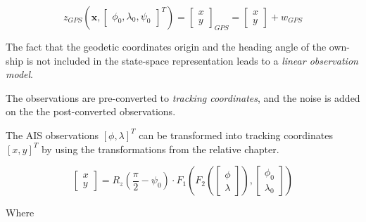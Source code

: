 \begin{equation}
z_{GPS}(\mathbf{x},\begin{bmatrix}\phi_{0}, \lambda_{0}, \psi_{\textit{0}} \end{bmatrix}^{T}) = \begin{bmatrix}
x \\
y
\end{bmatrix}_{GPS} = \begin{bmatrix}
x \\
y
\end{bmatrix} + w_{GPS}
\end{equation}

The fact that the geodetic coordinates origin and the heading angle of the own-ship is not included in the state-space representation leads to a \emph{linear observation model}.

The observations are pre-converted to \emph{tracking coordinates}, and the noise is added on the the post-converted observations.

The AIS observations $[\phi, \lambda]^{T}$ can be transformed into tracking coordinates $[x,y]^{T}$ by using the transformations from the relative chapter.


\begin{equation}
\begin{bmatrix}
x \\
y
\end{bmatrix} = R_z(\frac{\pi}{2}-\psi_{\textit{0}}) \cdot F_1\left(F_2(\begin{bmatrix}
\phi \\
\lambda
\end{bmatrix}),\begin{bmatrix}
\phi_0 \\ \lambda_0
\end{bmatrix}\right)
\end{equation}

Where

